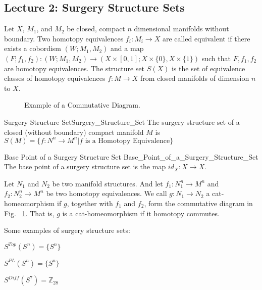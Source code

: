 \documentclass[crop=false,class=book,oneside]{standalone}                      %
\begin{document}
    \subsection{Lecture 2: Surgery Structure Sets}
        Let $X$, $M_{1}$, and $M_{2}$ be closed, compact $n$ dimensional
        manifolds without boundary. Two homotopy equivalences
        $f_{i}:M_{i}\rightarrow X$ are called equivalent if there exists a
        cobordism $(W;M_{1},M_{2})$ and a map
        $(F;f_{1},f_{2}):(W;M_{1},M_{2})%
         \rightarrow(X\times[0,1];X\times\{0\},X\times\{1\})$
        such that $F,f_{1},f_{2}$ are homotopy equivalences. The structure set
        $S(X)$ is the set of equivalence classes of homotopy equivalences
        $f:M\rightarrow X$ from closed manifolds of dimension $n$ to $X$.
        \begin{figure}[H]
            \centering
            \captionsetup{type=figure}
            \resizebox{0.3\textwidth}{!}{%
            }
            \caption{Example of a Commutative Diagram.}
            \label{fig:commutative_diagram_for_g_for_two_homotopy_equivalences}
        \end{figure}
        \begin{ldefinition}{Surgery Structure Set}{Surgery_Structure_Set}
            The surgery structure set of a closed (without boundary) compact
            manifold $M$ is
            $S(M)=\{f:N^{n}\rightarrow{M^{n}}|f%
             \textrm{ is a Homotopy Equivalence}\}$
        \end{ldefinition}
        \begin{ldefinition}{Base Point of a Surgery Structure Set}
                           {Base_Point_of_a_Surgery_Structure_Set}
            The base point of a surgery structure
            set is the map $id_{X}:X\rightarrow X$.
        \end{ldefinition}
        Let $N_{1}$ and $N_{2}$ be two manifold structures.
        And let $f_{1}:N_{1}^{n}\rightarrow M^{n}$ and
        $f_{2}:N_{2}^{n}\rightarrow M^{n}$ be two homotopy
        equivalences. We call $g:N_{1}\rightarrow N_{2}$ a
        cat-homeomorphism if $g$, together with $f_{1}$ and
        $f_{2}$, form the commutative diagram in Fig.~%
        \ref{fig:commutative_diagram_for_g_for_two_homotopy_equivalences}.
        That is, $g$ is a cat-homeomorphism if it
        homotopy commutes.
        \begin{example}
            Some examples of surgery structure sets:
            \begin{enumerate}
                \begin{multicols}{3}
                    \item $S^{Top}(S^{n})=\{S^{n}\}$
                    \item $S^{PL}(S^{n})=\{S^{n}\}$
                    \item $S^{Diff}(S^{7})=\mathbb{Z}_{28}$
                \end{multicols}
            \end{enumerate}
        \end{example}
\end{document}
